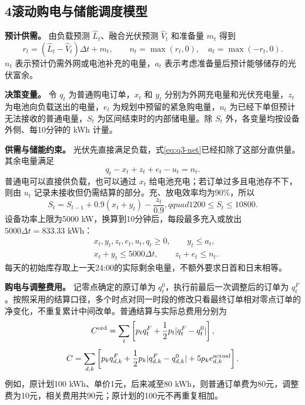 \subsection*{4\quad 滚动购电与储能调度模型}

\textbf{预计供需。} 由负载预测 $\widehat L_t$、融合光伏预测 $\widehat V_t$ 和准备量 $m_t$ 得到
\begin{equation}
r_t=(\widehat L_t-\widehat V_t)\Delta t+m_t,\qquad
n_t=\max(r_t,0),\quad a_t=\max(-r_t,0).
\label{eq:q3-net}
\end{equation}
$n_t$ 表示预计仍需外网或电池补充的电量，$a_t$ 表示考虑准备量后预计能够储存的光伏富余。

\textbf{决策变量。} 令 $q_t$ 为普通购电订单，$x_t$ 和 $y_t$ 分别为外网充电量和光伏充电量，$z_t$ 为电池向负载送出的电量，$e_t$ 为规划中预留的紧急购电量，$u_t$ 为已经下单但预计无法接收的普通电量，$S_t$ 为区间结束时的内部储电量。除 $S_t$ 外，各变量均按设备外侧、每10分钟的 kWh 计量。

\textbf{供需与储能约束。} 光伏先直接满足负载，式\eqref{eq:q3-net}已经扣除了这部分直供量。其余电量满足
\begin{equation}
q_t-x_t+z_t+e_t-u_t=n_t.
\label{eq:q3-balance}
\end{equation}
普通电可以直接供负载，也可以通过 $x_t$ 给电池充电；若订单过多且电池存不下，则由 $u_t$ 记录未接收但仍需结算的部分。充、放电效率均为90\%，所以
\begin{equation}
S_t=S_{t-1}+0.9(x_t+y_t)-\frac{z_t}{0.9},qquad
1200\le S_t\le10800.
\label{eq:q3-storage}
\end{equation}
设备功率上限为5000 kW，换算到10分钟后，每段最多充入或放出 $5000\Delta t=833.33$ kWh：
\begin{equation}
\begin{aligned}
&x_t,y_t,z_t,e_t,u_t,q_t\ge0,\qquad y_t\le a_t,\\
&x_t+y_t\le5000\Delta t,\qquad z_t+e_t\le n_t.
\end{aligned}
\label{eq:q3-bounds}
\end{equation}
每天的初始库存取上一天24:00的实际剩余电量，不额外要求日首和日末相等。

\textbf{购电与调整费用。} 记零点确定的原订单为 $q_t^0$，执行前最后一次调整后的订单为 $q_t^F$。按照采用的结算口径，多个时点对同一时段的修改只看最终订单相对零点订单的净变化，不重复累计中间改单。普通结算与实际总费用分别为
\begin{equation}
C^{\rm ord}=\sum_t\left[p_tq_t^F+\frac12p_t|q_t^F-q_t^0|\right],
\label{eq:q3-ordinary}
\end{equation}
\begin{equation}
C=\sum_{d,k}\left[p_kq_{d,k}^F+\frac12p_k|q_{d,k}^F-q_{d,k}^0|
+5p_ke^{\rm actual}_{d,k}\right].
\label{eq:q3-bill}
\end{equation}
例如，原计划100 kWh、单价1元，后来减至80 kWh，则普通订单费为80元，调整费为10元，相关费用共90元；原计划的100元不再重复相加。

